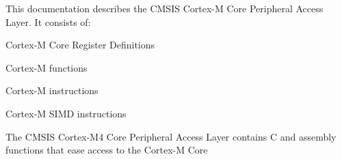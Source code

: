 This documentation describes the CMSIS Cortex-\/M Core Peripheral Access Layer. It consists of\+:


\begin{DoxyItemize}
\item Cortex-\/M Core Register Definitions
\item Cortex-\/M functions
\item Cortex-\/M instructions
\item Cortex-\/M SIMD instructions
\end{DoxyItemize}

The CMSIS Cortex-\/\+M4 Core Peripheral Access Layer contains C and assembly functions that ease access to the Cortex-\/M Core 